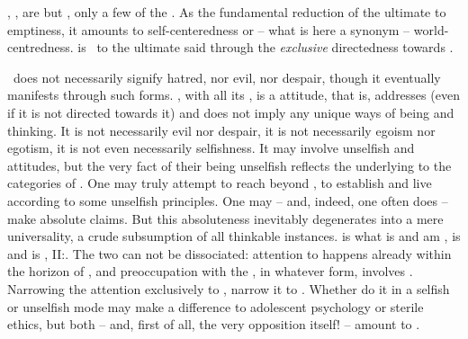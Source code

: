 \pa\label{pa:notno} , ,  are but
, only a few  of the  \No.  As the
fundamental reduction of the ultimate  to emptiness, it amounts
to {self-centeredness} or -- what is here a synonym -- {world-centredness}.
 is \No\ to the ultimate  said 
through the {\em exclusive} directedness towards .
%

\No\ does not  necessarily signify hatred, nor evil, nor despair, 
though it eventually manifests through such forms.  , with all
its , is a  attitude, that is, addresses 
(even if it is not directed towards it) and does not imply any unique ways of
 being and thinking.  It is not necessarily evil nor despair, it is
not necessarily egoism nor egotism, it is not even necessarily selfishness. It
may involve unselfish  and attitudes, but the very fact of their being
unselfish reflects the underlying  to the categories of
.  One may truly attempt to reach beyond , to establish
and live according to some unselfish principles. One may -- and, indeed, one
often does -- make absolute claims. But this absoluteness inevitably degenerates
into a mere universality, a crude subsumption of all thinkable instances.
 is what is  and  am ,  is  and  is ,
II:.  The two can not be dissociated: attention to
 happens already within the horizon of , and
preoccupation with the , in whatever form, involves
.  Narrowing the attention exclusively to , 
narrow it to . Whether  do it in a selfish or unselfish mode
may make a difference to adolescent psychology or sterile ethics, but
 both -- and, first of all, the very opposition itself! --
amount to .


